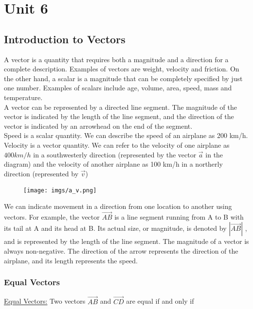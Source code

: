 \documentclass{article}
\begin{document}
\section{Unit 6}
\subsection{Introduction to Vectors}
A vector is a quantity that requires both a magnitude and a direction for a complete description.  Examples of vectors are weight, velocity and friction.  On the other hand, a scalar is a magnitude that can be completely specified by just one number.  Examples of scalars include age, volume, area, speed, mass and temperature.\\


A vector can be represented by a directed line segment.  The magnitude of the vector is indicated by the length of the line segment, and the direction of the vector is indicated by an arrowhead on the end of the segment.\\


Speed is a scalar quantity. We can describe the speed of an airplane as 200 km/h.\\


Velocity is a vector quantity. We can refer to the velocity of one airplane as $400 km/h$ in a southwesterly direction (represented by the vector $\vec{a}$ in the diagram) and the velocity of another airplane as 100 km/h in a northerly direction (represented by $\Vec{v}$)\\
\begin{figure}[h]
    \centering
    \texttt{[image: imgs/a\_v.png]}
\end{figure}

We can indicate movement in a direction from one location to another using vectors. For example, the vector $\overrightarrow{AB}$ is a line segment running from A to B with its tail at A and its head at B. Its actual size, or magnitude, is denoted by $|\overrightarrow{AB}|$ , and is represented by the length of the line segment. The magnitude of a vector is always non-negative. The direction of the arrow represents the direction of the airplane, and its length represents the speed.
\newpage
\subsubsection{Equal Vectors}
\underline{Equal Vectors:}
Two vectors $\overrightarrow{AB}$ and $\overrightarrow{CD}$ are equal if and only if\\
\end{document}
